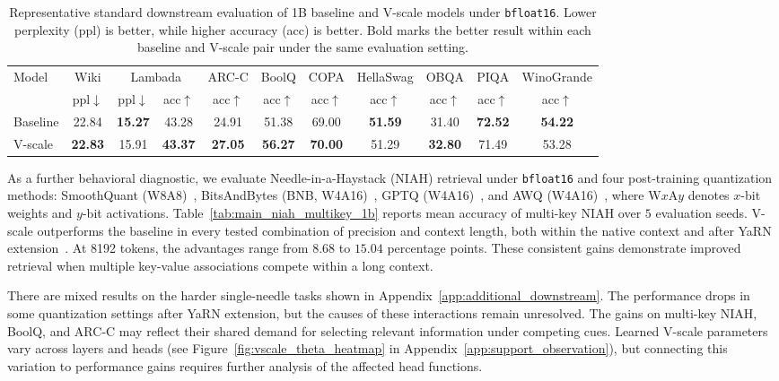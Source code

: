 \documentclass{article}
\theoremstyle{plain}
\theoremstyle{definition}
\theoremstyle{remark}
\begin{document}
\begin{table}[t]
    \centering
    \caption{
    Representative standard downstream evaluation of 1B baseline and V-scale models under \texttt{bfloat16}.
    Lower perplexity (ppl) is better, while higher accuracy (acc) is better.
    Bold marks the better result within each baseline and V-scale pair under the same evaluation setting.
    }\label{tab:main_standard_1b}
	\setlength\tabcolsep{3pt}
    \begin{tabular}{lcccccccccc}
        \toprule
        \multirow{2}{*}{Model} & Wiki & \multicolumn{2}{c}{Lambada} & ARC-C & BoolQ & COPA & HellaSwag & OBQA & PIQA & WinoGrande \\
        & ppl$\downarrow$ & ppl$\downarrow$ & acc$\uparrow$ & acc$\uparrow$ & acc$\uparrow$ & acc$\uparrow$ & acc$\uparrow$ & acc$\uparrow$ & acc$\uparrow$ & acc$\uparrow$ \\
        \midrule
        Baseline & 22.84 & \textbf{15.27} & 43.28 & 24.91 & 51.38 & 69.00 & \textbf{51.59} & 31.40 & \textbf{72.52} & \textbf{54.22} \\
        V-scale  & \textbf{22.83} & 15.91 & \textbf{43.37} & \textbf{27.05} & \textbf{56.27} & \textbf{70.00} & 51.29 & \textbf{32.80} & 71.49 & 53.28 \\
        \bottomrule
    \end{tabular}
\end{table}

As a further behavioral diagnostic, we evaluate Needle-in-a-Haystack (NIAH) retrieval under \texttt{bfloat16} and four post-training quantization methods: SmoothQuant (W8A8)~\cite{xiao2023smoothquant}, BitsAndBytes (BNB, W4A16)~\cite{dettmers2023qlora}, GPTQ (W4A16)~\cite{frantar2023optq}, and AWQ (W4A16)~\cite{lin2024awq}, where W$x$A$y$ denotes $x$-bit weights and $y$-bit activations. Table~\ref{tab:main_niah_multikey_1b} reports mean accuracy of multi-key NIAH over $5$ evaluation seeds. V-scale outperforms the baseline in every tested combination of precision and context length, both within the native context and after YaRN extension~\cite{peng2024yarn}. At 8192 tokens, the advantages range from $8.68$ to $15.04$ percentage points. These consistent gains demonstrate improved retrieval when multiple key-value associations compete within a long context.

There are mixed results on the harder single-needle tasks shown in Appendix~\ref{app:additional_downstream}. The performance drops in some quantization settings after YaRN extension, but the causes of these interactions remain unresolved. The gains on multi-key NIAH, BoolQ, and ARC-C may reflect their shared demand for selecting relevant information under competing cues. Learned V-scale parameters vary across layers and heads (see Figure~\ref{fig:vscale_theta_heatmap} in Appendix~\ref{app:support_observation}), but connecting this variation to performance gains requires further analysis of the affected head functions.
\end{document}
